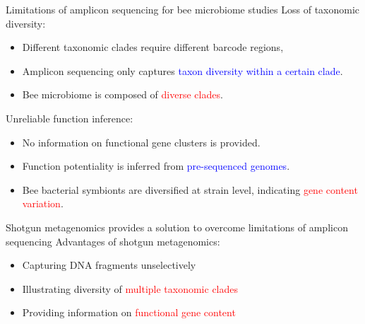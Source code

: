 \documentclass{beamer}
\begin{document}
\begin{frame}{Limitations of amplicon sequencing for bee microbiome studies}
    Loss of taxonomic diversity:
    \begin{itemize}
        \item Different taxonomic clades require different barcode regions,  
        \item Amplicon sequencing only captures \textcolor{blue}{taxon diversity within a certain clade}.
        \item Bee microbiome is composed of \textcolor{red}{diverse clades}.
    \end{itemize}
    \newline
    Unreliable function inference:
    \begin{itemize}
        \item No information on functional gene clusters is provided.
        \item Function potentiality is inferred from \textcolor{blue}{pre-sequenced genomes}.
        \item Bee bacterial symbionts are diversified at strain level, indicating \textcolor{red}{gene content variation}.
    \end{itemize}
\end{frame}

\begin{frame}{Shotgun metagenomics provides a solution to overcome limitations of amplicon sequencing}
    Advantages of shotgun metagenomics:
    \begin{itemize}
        \item Capturing DNA fragments unselectively
        \item Illustrating diversity of \textcolor{red}{multiple taxonomic clades}
        \item Providing information on \textcolor{red}{functional gene content}
    \end{itemize}
    \newline
\end{frame}
\end{document}
